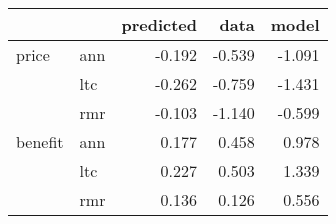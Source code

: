 \begin{tabular}{llrrr}
\toprule
        &     &  predicted &   data &  model \\
\midrule
price & ann &     -0.192 & -0.539 & -1.091 \\
        & ltc &     -0.262 & -0.759 & -1.431 \\
        & rmr &     -0.103 & -1.140 & -0.599 \\
benefit & ann &      0.177 &  0.458 &  0.978 \\
        & ltc &      0.227 &  0.503 &  1.339 \\
        & rmr &      0.136 &  0.126 &  0.556 \\
\bottomrule
\end{tabular}
